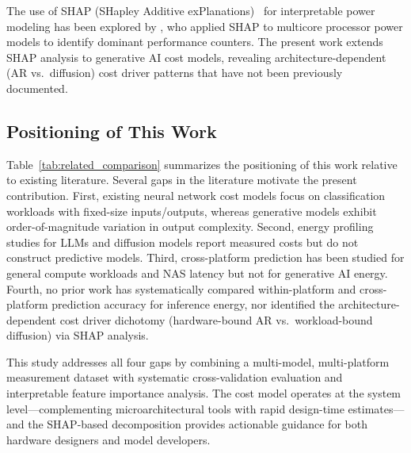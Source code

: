 \documentclass[review,12pt,authoryear]{elsarticle}
\begin{document}
The use of SHAP (SHapley Additive exPlanations)~\citep{lundberg2017shap} for interpretable power modeling has been explored by \citet{zhang2020shap}, who applied SHAP to multicore processor power models to identify dominant performance counters.
The present work extends SHAP analysis to generative AI cost models, revealing architecture-dependent (AR vs.\ diffusion) cost driver patterns that have not been previously documented.

\subsection{Positioning of This Work}
\label{sec:rw_positioning}

Table~\ref{tab:related_comparison} summarizes the positioning of this work relative to existing literature.
Several gaps in the literature motivate the present contribution.
First, existing neural network cost models focus on classification workloads with fixed-size inputs/outputs, whereas generative models exhibit order-of-magnitude variation in output complexity.
Second, energy profiling studies for LLMs and diffusion models report measured costs but do not construct predictive models.
Third, cross-platform prediction has been studied for general compute workloads and NAS latency but not for generative AI energy.
Fourth, no prior work has systematically compared within-platform and cross-platform prediction accuracy for inference energy, nor identified the architecture-dependent cost driver dichotomy (hardware-bound AR vs.\ workload-bound diffusion) via SHAP analysis.

This study addresses all four gaps by combining a multi-model, multi-platform measurement dataset with systematic cross-validation evaluation and interpretable feature importance analysis.
The cost model operates at the system level---complementing microarchitectural tools with rapid design-time estimates---and the SHAP-based decomposition provides actionable guidance for both hardware designers and model developers.
\end{document}
